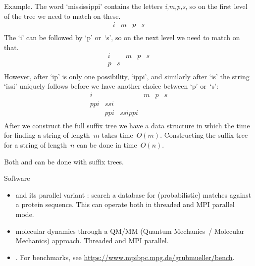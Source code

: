 Example. The word `mississippi' contains the letters \emph{i,m,p,s},
so on the first level of the tree we need to match on these.
\[ 
\begin{array}{*{12}{c}}
i&m&p&s\\
\end{array}
\]
The `i' can be followed by `p' or~`s', so on the next level
we need to match on that.
\[ 
\begin{array}{*{12}{c}}
i& &m&p&s\\
p&s\\
\end{array}
\]
However, after `ip' is only one possibility, `ippi', 
and similarly after `is' the string `issi' uniquely
follows before we have another choice between `p' or~`s':
\[ 
\begin{array}{*{12}{c}}
i  &   &      &m&p&s\\
ppi&ssi\\
   &ppi&ssippi\\
\end{array}
\]
After we construct the full suffix tree we have a data structure
in which the time for finding a string of length~$m$ takes
time~$O(m)$.
Constructing the suffix tree for a string of length~$n$ 
can be done in time~$O(n)$.

Both 
 and  can
be done with suffix trees.

 {Software}

\begin{itemize}
\item {} and its parallel variant :
  search a database for (probabilistic) matches against a protein sequence.
  This can operate both in threaded and MPI parallel mode.
\item {} molecular dynamics through a QM/MM
  (Quantum Mechanics~/ Molecular Mechanics) approach.
  Threaded and MPI parallel.
\item {}.
  For benchmarks, see \url{https://www.mpibpc.mpg.de/grubmueller/bench}.
\end{itemize}

\endinput

\Level 0 {Protein interaction networks}

\Level 0 {Data mining}

From~\cite{wang:undergrad-bioinf-course}
\begin{quotation}
  In our course, a Hadoop based distributed data mining system is used
  in our course to implement some basic data mining algorithms for the
  analysis of various kinds of gene expression datasets, including 36
  time-series gene expression datasets of yeast, 79 tissue- specific
  gene expression datasets of human and so on.
\end{quotation}
